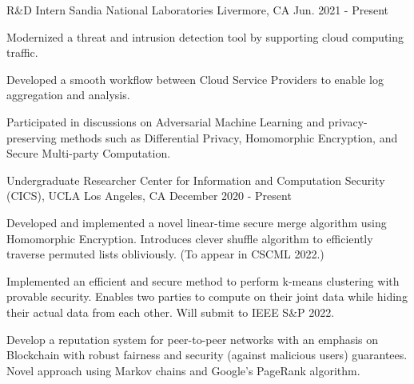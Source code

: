 

\begin{cventries}

  \resumeentry
    {R\&D Intern} %
    {Sandia National Laboratories} %
    {Livermore, CA} %
    {Jun. 2021 - Present} %
    {
      \begin{cvitems} %
        \item{Modernized a threat and intrusion detection tool by supporting cloud computing traffic.}
        \item{Developed a smooth workflow between Cloud Service Providers to enable log aggregation and analysis.}
        \item{Participated in discussions on Adversarial Machine Learning and privacy-preserving methods such as Differential Privacy, Homomorphic Encryption, and Secure Multi-party Computation.}
      \end{cvitems}
    }

  \resumeentry
    {Undergraduate Researcher} %
    {Center for Information and Computation Security (CICS), UCLA} %
    {Los Angeles, CA} %
    {December 2020 - Present} %
    {
      \begin{cvitems} %
        \item{Developed and implemented a novel linear-time secure merge algorithm using Homomorphic Encryption. Introduces clever shuffle algorithm to efficiently traverse permuted lists obliviously. (To appear in CSCML 2022.)}
        \item{Implemented an efficient and secure method to perform k-means clustering with provable security. Enables two parties to compute on their joint data while hiding their actual data from each other. Will submit to IEEE S\&P 2022.}
        \item{Develop a reputation system for peer-to-peer networks with an emphasis on Blockchain with robust fairness and security (against malicious users) guarantees. Novel approach using Markov chains and Google's PageRank algorithm.}
      \end{cvitems}
    }


\end{cventries}
